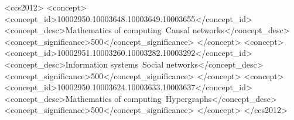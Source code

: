 \documentclass[sigconf]{acmart}
\begin{document}

%

\begin{CCSXML}
<ccs2012>
  <concept>
      <concept_id>10002950.10003648.10003649.10003655</concept_id>
      <concept_desc>Mathematics of computing~Causal networks</concept_desc>
      <concept_significance>500</concept_significance>
      </concept>
  <concept>
      <concept_id>10002951.10003260.10003282.10003292</concept_id>
      <concept_desc>Information systems~Social networks</concept_desc>
      <concept_significance>500</concept_significance>
      </concept>
  <concept>
      <concept_id>10002950.10003624.10003633.10003637</concept_id>
      <concept_desc>Mathematics of computing~Hypergraphs</concept_desc>
      <concept_significance>500</concept_significance>
      </concept>
 </ccs2012>
\end{CCSXML}



\maketitle





%



\vspace{-2mm}
\end{document}
